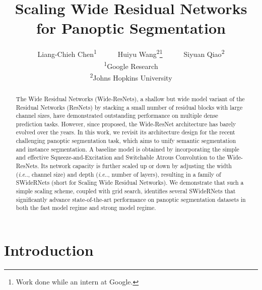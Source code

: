 \documentclass[final]{cvpr}
\makeatletter
\DeclareRobustCommand\onedot{\futurelet\@let@token\@onedot}
\def\@onedot{\ifx\@let@token.\else.\null\fi\xspace}
\def\ie{\emph{i.e}\onedot} \def\Ie{\emph{I.e}\onedot}
\makeatother
\begin{document}
\title{Scaling Wide Residual Networks for Panoptic Segmentation}

\author{Liang-Chieh Chen\textsuperscript{1}~~~~~~Huiyu Wang\textsuperscript{2}\thanks{Work done while an intern at Google.}~~~~~~Siyuan Qiao\textsuperscript{2}\footnotemark[1]\\
\textsuperscript{1}Google Research\\\textsuperscript{2}Johns Hopkins University\\
}


\maketitle

\begin{abstract}
The Wide Residual Networks (Wide-ResNets), a shallow but wide model variant of the Residual Networks (ResNets) by stacking a small number of residual blocks with large channel sizes, have demonstrated outstanding performance on multiple dense prediction tasks. However, since proposed, the Wide-ResNet architecture has barely evolved over the years. In this work, we revisit its architecture design for the recent challenging panoptic segmentation task, which aims to unify semantic segmentation and instance segmentation. A baseline model is obtained by incorporating the simple and effective Squeeze-and-Excitation and Switchable Atrous Convolution to the Wide-ResNets. Its network capacity is further scaled up or down by adjusting the width (\ie, channel size) and depth (\ie, number of layers), resulting in a family of SWideRNets (short for Scaling Wide Residual Networks). We demonstrate that such a simple scaling scheme, coupled with grid search, identifies several SWideRNets that significantly advance state-of-the-art performance on panoptic segmentation datasets in both the fast model regime and strong model regime.
\end{abstract}
 \section{Introduction}
\label{sec:intro}
\end{document}
